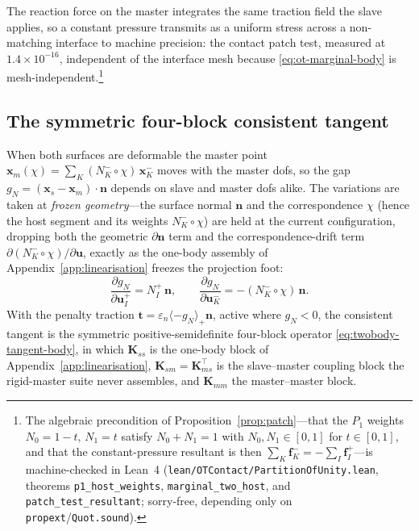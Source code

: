 \documentclass{svjour3}                 %
\newcommand{\nbf}{\bm{n}}
\newcommand{\tbf}{\bm{t}}
\newcommand{\xbf}{\bm{x}}
\newcommand{\ubf}{\bm{u}}
\newcommand{\fbf}{\bm{f}}
\newcommand{\gn}{g_{\scriptscriptstyle N}}
\newcommand{\pos}[1]{\langle #1\rangle_{+}}
\newcommand{\code}[1]{\texttt{#1}}
\begin{document}
The reaction force on the master integrates the same traction field the slave applies, so a constant
pressure transmits as a uniform stress across a non-matching interface to machine precision: the contact patch
test, measured at $1.4\times10^{-16}$, independent of the
interface mesh because \eqref{eq:ot-marginal-body} is mesh-independent.\footnote{The algebraic precondition of
Proposition~\ref{prop:patch}---that the $P_1$ weights $N_0=1-t,\,N_1=t$ satisfy $N_0+N_1=1$ with $N_0,N_1\in[0,1]$
for $t\in[0,1]$, and that the constant-pressure resultant is then $\sum_K\fbf_K^-=-\sum_I\fbf_I^+$---is
machine-checked in Lean~4 (\code{lean/OTContact/PartitionOfUnity.lean}, theorems \code{p1\_host\_weights},
\code{marginal\_two\_host}, and \code{patch\_test\_resultant}; sorry-free, depending only on
\code{propext}/\code{Quot.sound}).}

\subsection{The symmetric four-block consistent tangent}\label{app:ot:tangent}

When both surfaces are deformable the master point $\xbf_m(\chi)=\sum_K(N_K^-\!\circ\chi)\,\xbf_K^-$ moves with
the master dofs, so the gap $\gn=(\xbf_s-\xbf_m)\!\cdot\!\nbf$ depends on slave and master dofs alike. The
variations are taken at \emph{frozen geometry}---the surface normal $\nbf$ and the correspondence $\chi$ (hence
the host segment and its weights $N_K^-\!\circ\chi$) are held at the current configuration, dropping both the
geometric $\partial\nbf$ term and the correspondence-drift term $\partial(N_K^-\!\circ\chi)/\partial\ubf$, exactly
as the one-body assembly of Appendix~\ref{app:linearisation} freezes the projection foot:
\begin{equation}\label{eq:ot-gapvar}
\frac{\partial\gn}{\partial\ubf_I^+}=N_I^+\,\nbf,\qquad
\frac{\partial\gn}{\partial\ubf_K^-}=-(N_K^-\!\circ\chi)\,\nbf .
\end{equation}
With the penalty traction $\tbf=\varepsilon_n\pos{-\gn}\nbf$, active where $\gn<0$, the consistent tangent is the
symmetric positive-semidefinite four-block operator \eqref{eq:twobody-tangent-body},
in which $\bm K_{ss}$ is the one-body block of Appendix~\ref{app:linearisation}, $\bm K_{sm}=\bm K_{ms}^{\top}$ is
the slave--master coupling block the rigid-master suite never assembles, and $\bm K_{mm}$ the master--master
block.
\end{document}

